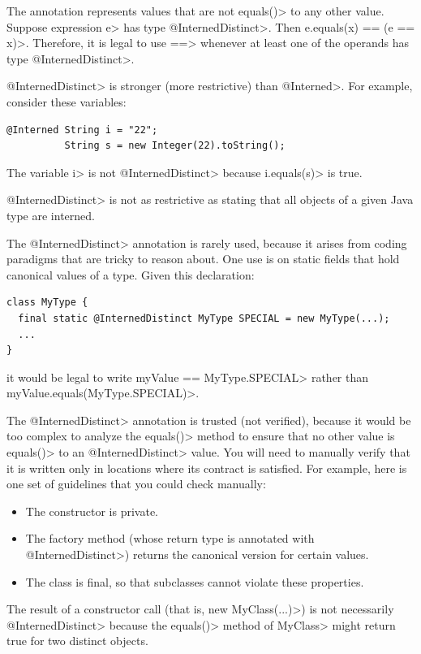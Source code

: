 The  annotation
represents values that are not \<equals()> to any other value.  Suppose
expression \<e> has type \<@InternedDistinct>.  Then \<e.equals(x) == (e ==
x)>.  Therefore, it is legal to use \<==> whenever at least one of the
operands has type \<@InternedDistinct>.

\<@InternedDistinct> is stronger (more restrictive) than \<@Interned>.
For example, consider these variables:

\begin{Verbatim}
@Interned String i = "22";
          String s = new Integer(22).toString();
\end{Verbatim}

\noindent
The variable \<i> is not \<@InternedDistinct> because \<i.equals(s)> is true.

\<@InternedDistinct> is not as restrictive as stating that all objects of a
given Java type are interned.

The \<@InternedDistinct> annotation is rarely used, because it arises from
coding paradigms that are tricky to reason about.
%
One use is on static fields
that hold canonical values of a type.
Given this declaration:

\begin{Verbatim}
class MyType {
  final static @InternedDistinct MyType SPECIAL = new MyType(...);
  ...
}
\end{Verbatim}

\noindent
it would be legal to write \<myValue == MyType.SPECIAL> rather than
\<myValue.equals(MyType.SPECIAL)>.

The \<@InternedDistinct> annotation is trusted (not verified), because it would be too
complex to analyze the \<equals()> method to ensure that no other value is
\<equals()> to an \<@InternedDistinct> value.  You will need to manually
verify that it is written only in locations where its contract is satisfied.
For example, here is one set of guidelines that you could check manually:
\begin{itemize}
\item The constructor is private.
\item The factory method (whose return type is annotated with
  \<@InternedDistinct>) returns the canonical version for certain values.
\item The class is final, so that subclasses cannot violate these properties.
\end{itemize}

The result of a constructor call (that is, \<new MyClass(...)>) is not
necessarily \<@InternedDistinct> because the \<equals()> method of
\<MyClass> might return true for two distinct objects.


